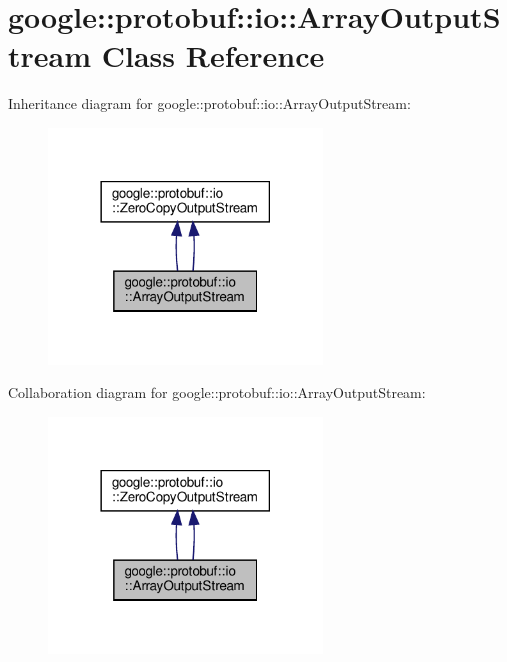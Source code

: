 \hypertarget{classgoogle_1_1protobuf_1_1io_1_1ArrayOutputStream}{}\section{google\+:\+:protobuf\+:\+:io\+:\+:Array\+Output\+Stream Class Reference}
\label{classgoogle_1_1protobuf_1_1io_1_1ArrayOutputStream}


Inheritance diagram for google\+:\+:protobuf\+:\+:io\+:\+:Array\+Output\+Stream\+:
\nopagebreak
\begin{figure}[H]
\begin{center}
\leavevmode
\includegraphics[width=206pt]{classgoogle_1_1protobuf_1_1io_1_1ArrayOutputStream__inherit__graph}
\end{center}
\end{figure}


Collaboration diagram for google\+:\+:protobuf\+:\+:io\+:\+:Array\+Output\+Stream\+:
\nopagebreak
\begin{figure}[H]
\begin{center}
\leavevmode
\includegraphics[width=206pt]{classgoogle_1_1protobuf_1_1io_1_1ArrayOutputStream__coll__graph}
\end{center}
\end{figure}
